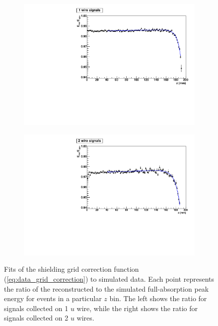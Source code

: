 \documentclass[herrin-thesis.tex]{subfiles}
\begin{document}
\begin{figure}[htbp]
\centering
	\begin{subfigure}[t]{0.48\textwidth}
		\centering
		\includegraphics[width=\textwidth]{./plots/data_grid_correction_Th1wire.pdf}
	\end{subfigure}\hfill%
	\begin{subfigure}[t]{0.48\textwidth}
		\centering
		\includegraphics[width=\textwidth]{./plots/data_grid_correction_Th2wire.pdf}
	\end{subfigure}
	\caption[Fits to determine the shieldin grid correction parameters]{Fits of the shielding grid correction function (\cref{eq:data_grid_correction}) to simulated  data. Each point represents the ratio of the reconstructed to the simulated full-absorption peak energy for events in a particular \(z\) bin. The left shows the ratio for signals collected on 1 \(u\) wire, while the right shows the ratio for signals collected on 2 \(u\) wires.}
	\label{fig:data_grid_correction_fits}
\end{figure}
\end{document}
